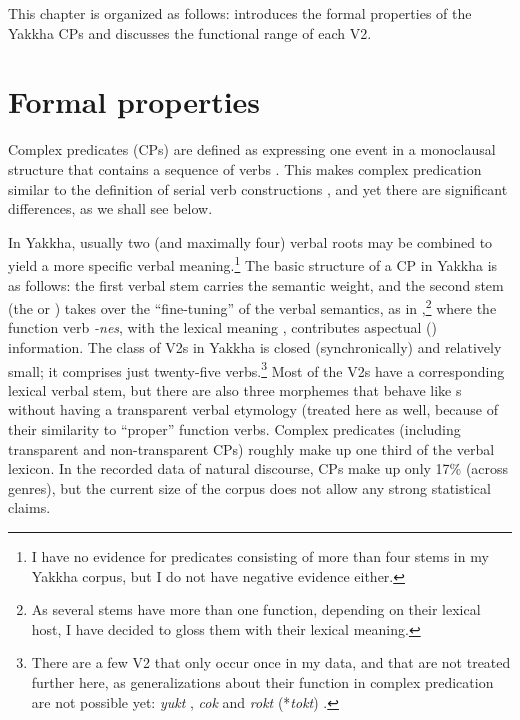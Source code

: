 This chapter is organized as follows:   introduces the formal properties of the Yakkha CPs and  discusses the functional range of each V2.

\section{Formal properties}\label{verb-verb-formal}
 
Complex predicates (CPs) are defined as expressing one event in a monoclausal structure that contains a sequence of verbs \citep{Givon1991Some-substantive}. This makes complex predication similar to the definition of serial verb constructions \citep{Aikhenvald2006_Serial, Durie1997_Grammatical}, and yet there are significant differences, as we shall see below. 
 
In Yakkha, usually two (and maximally four) verbal roots may be combined to yield a more specific verbal meaning.\footnote{I have no evidence for predicates consisting of more than four stems in my Yakkha corpus, but I do not have negative evidence either.} The basic structure of a CP in Yakkha is as follows: the first verbal stem carries the semantic weight, and the second stem (the  or ) takes over the “fine-tuning” of the verbal semantics,  as in \Next,\footnote{As several stems have more than one function, depending on their lexical host, I have decided to gloss them with their lexical meaning.} where the function verb \emph{-nes}, with the lexical meaning , contributes aspectual () information. The class of V2s in Yakkha is closed (synchronically) and relatively small; it comprises just twenty-five verbs.\footnote{There are a few V2 that only occur once in my data, and that are not treated further here, as generalizations about their function in complex predication are not possible yet: \emph{yukt} , \emph{cok}  and \emph{rokt} (*\emph{tokt}) .} Most of the V2s have a corresponding lexical verbal stem, but there are also three morphemes that behave like s without having a transparent verbal etymology (treated here as well, because of their similarity to “proper” function verbs. Complex predicates (including transparent and non-transparent CPs) roughly make up one third of the verbal lexicon. In the recorded  data of natural discourse, CPs make up only 17\% (across genres), but the current size of the corpus does not allow any strong statistical claims.



